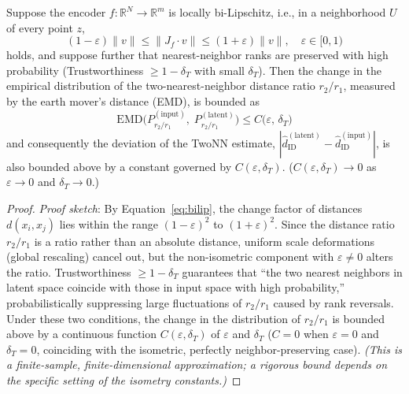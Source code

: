\documentclass[make,article,submit,pdftex,moreauthors]{Definitions/mdpi}
\newcommand{\R}{\mathbb{R}}
\begin{document}
\begin{Proposition}\label{thm:twonn_stability}
Suppose the encoder $f: \R^N \to \R^m$ is locally bi-Lipschitz,
i.e., in a neighborhood $U$ of every point $z$,
\begin{equation}
  (1-\varepsilon)\|v\| \leq \|J_f \cdot v\| \leq (1+\varepsilon)\|v\|,
  \quad \varepsilon \in [0,1)
  \label{eq:bilip}
\end{equation}
holds, and suppose further that nearest-neighbor ranks are preserved with high
probability (Trustworthiness $\geq 1 - \delta_T$ with small $\delta_T$).
Then the change in the empirical distribution of the two-nearest-neighbor distance ratio
$r_2/r_1$, measured by the earth mover's distance (EMD), is bounded as
\begin{equation}
  \mathrm{EMD}\bigl(P_{r_2/r_1}^{(\mathrm{input})},\; P_{r_2/r_1}^{(\mathrm{latent})}\bigr)
  \leq C\bigl(\varepsilon,\, \delta_T\bigr)
  \label{eq:twonn_stab}
\end{equation}
and consequently the deviation of the TwoNN estimate,
$|\hat{d}_\mathrm{ID}^{(\mathrm{latent})} - \hat{d}_\mathrm{ID}^{(\mathrm{input})}|$,
is also bounded above by a constant governed by $C(\varepsilon,\delta_T)$.
($C(\varepsilon, \delta_T) \to 0$ as $\varepsilon \to 0$ and $\delta_T \to 0$.)
\end{Proposition}

\begin{proof}
\textit{Proof sketch}:
By Equation~\eqref{eq:bilip}, the change factor of distances $d(x_i, x_j)$ lies within
the range $(1-\varepsilon)^2$ to $(1+\varepsilon)^2$.
Since the distance ratio $r_2/r_1$ is a ratio rather than an absolute distance, uniform
scale deformations (global rescaling) cancel out, but the non-isometric component with
$\varepsilon \neq 0$ alters the ratio.
Trustworthiness $\geq 1-\delta_T$ guarantees that ``the two nearest neighbors in latent
space coincide with those in input space with high probability,'' probabilistically
suppressing large fluctuations of $r_2/r_1$ caused by rank reversals.
Under these two conditions, the change in the distribution of $r_2/r_1$ is bounded above
by a continuous function $C(\varepsilon,\delta_T)$ of $\varepsilon$ and $\delta_T$
($C=0$ when $\varepsilon=0$ and $\delta_T=0$, coinciding with the isometric,
perfectly neighbor-preserving case).
\textit{(This is a finite-sample, finite-dimensional approximation; a rigorous bound
depends on the specific setting of the isometry constants.)}
\end{proof}
\end{document}
